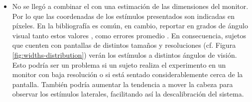 \begin{itemize}
  \item No se llegó a combinar el \eyetracking con una estimación de las
dimensiones del monitor.
  Por lo que las coordenadas de los estímulos presentados son indicadas en
píxeles.
  En la bibliografía es común, en cambio, reportar en grados de ángulo visual
tanto estos valores \cite{munoz_2004_look_away,
olincy_1997_age_diminishes_performance, smyrnis_2002_big_sample}, como errores
promedio \cite{huang_2016_pace, santini_2017_eyerectoo}.
  En consecuencia, sujetos que cuenten con pantallas de distintos tamaños y
resoluciones (cf. Figura \ref{fig:widths-distribution}) verán los
estímulos a distintos ángulos de visión.
  Esto podría ser un problema si un sujeto realiza el experimento en un monitor
con baja resolución o si está sentado considerablemente cerca de la pantalla.
  También podría aumentar la tendencia a mover la cabeza para observar los
estímulos laterales, facilitando así la descalibración del sistema.
\end{itemize}

